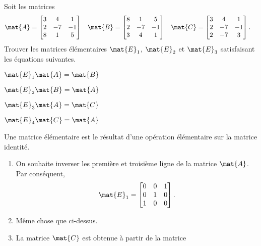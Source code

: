 \begin{exercice}
  Soit les matrices
  \begin{align*}
    \mat{A}
    &=
    \begin{bmatrix}
      3 & 4 & 1 \\ 2 & -7 & -1 \\ 8 & 1 & 5
    \end{bmatrix} &
    \mat{B}
    &=
    \begin{bmatrix}
      8 & 1 & 5 \\ 2 & -7 & -1 \\ 3 & 4 & 1
    \end{bmatrix} &
    \mat{C}
    &=
    \begin{bmatrix}
      3 & 4 & 1 \\ 2 & -7 & -1 \\ 2 & -7 & 3
    \end{bmatrix}.
  \end{align*}
  Trouver les matrices élémentaires $\mat{E}_1$, $\mat{E}_2$ et
  $\mat{E}_3$ satisfaisant les équations suivantes.
  \begin{enumerate}
    \begin{multicols}{4}
    \item $\mat{E}_1 \mat{A} = \mat{B}$
    \item $\mat{E}_2 \mat{B} = \mat{A}$
    \item $\mat{E}_3 \mat{A} = \mat{C}$
    \item $\mat{E}_4 \mat{C} = \mat{A}$
    \end{multicols}
  \end{enumerate}
  \begin{sol}
    Une matrice élémentaire est le résultat d'une opération
    élémentaire sur la matrice identité.
    \begin{enumerate}
    \item On souhaite inverser les première et troisième ligne de la
      matrice $\mat{A}$. Par conséquent,
      \begin{displaymath}
        \mat{E}_1 =
        \begin{bmatrix}
          0 & 0 & 1 \\ 0 & 1 & 0 \\ 1 & 0 & 0
        \end{bmatrix}.
      \end{displaymath}
    \item Même chose que ci-dessus.
    \item La matrice $\mat{C}$ est obtenue à partir de la matrice

\end{enumerate}
\end{sol}
\end{exercice}
